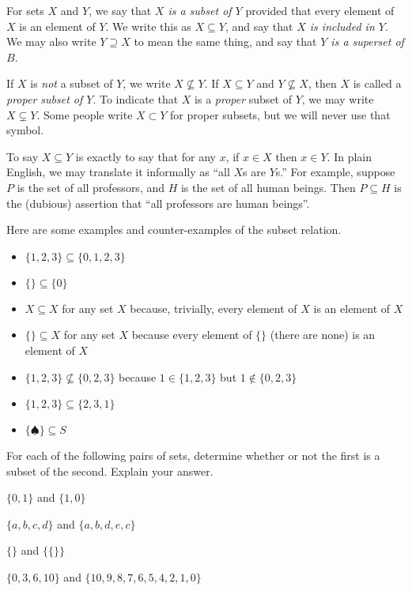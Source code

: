 \begin{defn}
  For sets $X$ and $Y$, we say that \emph{$X$ is a subset of $Y$} provided that every element of $X$ is an element of $Y$. We 
  write this as $X\subseteq Y$, and say that \emph{$X$ is included in $Y$}.  We may also write $Y\supseteq X$ 
  to mean the same thing, and say that \emph{$Y$ is a superset of $B$}.

  If $X$ is \emph{not} a subset of $Y$, we write $X\not\subseteq Y$. If $X\subseteq Y$ and $Y\not\subseteq X$, then $X$ is called a
  \emph{proper subset of $Y$}. To indicate that $X$ is a \emph{proper} subset of $Y$, we may write $X\subsetneq Y$. Some people write $X\subset Y$ for proper subsets, but we will never use that symbol.
\end{defn}

To say $X\subseteq Y$ is exactly to say that for any $x$, if $x\in X$ then $x\in Y$. In plain English, we may translate it informally as ``all $X$s are $Y$s.'' For example, suppose $P$ is the set of all professors, and $H$ is the set of all human beings. Then $P\subseteq H$ is the (dubious) assertion that ``all professors are human beings''. 

\begin{example}
  Here are some examples and counter-examples of the subset relation.
  \begin{itemize}
  \item $\{1,2,3\}\subseteq \{0,1,2,3\}$
  \item $\{\}\subseteq \{0\}$
  \item $X\subseteq X$ for any set $X$ because, trivially, every
    element of $X$ is an element of $X$
  \item $\{\} \subseteq X$ for any set $X$ because every element of
    $\{\}$ (there are none) is an element of $X$
  \item $\{1,2,3\}\not\subseteq \{0,2,3\}$ because $1\in \{1,2,3\}$
    but $1\notin \{0,2,3\}$
  \item $\{1,2,3\}\subseteq \{2,3,1\}$
  \item $\{\spadesuit\} \subseteq S$
  \end{itemize}
\end{example}
\printbreak

\begin{exercises}
	For each of the following pairs of sets, determine whether or
  not the first is a subset of the second. Explain your answer.
  \begin{nextexercise}
  \item $\{0,1\}$ and $\{1,0\}$
  \item $\{a,b,c,d\}$ and $\{a,b,d,e,c\}$
  \item $\{\}$ and $\{\{\}\}$
  \item $\{0,3,6,10\}$ and $\{10,9,8,7,6,5,4,2,1, 0\}$
  \end{nextexercise}
\end{exercises}
\printbreak

